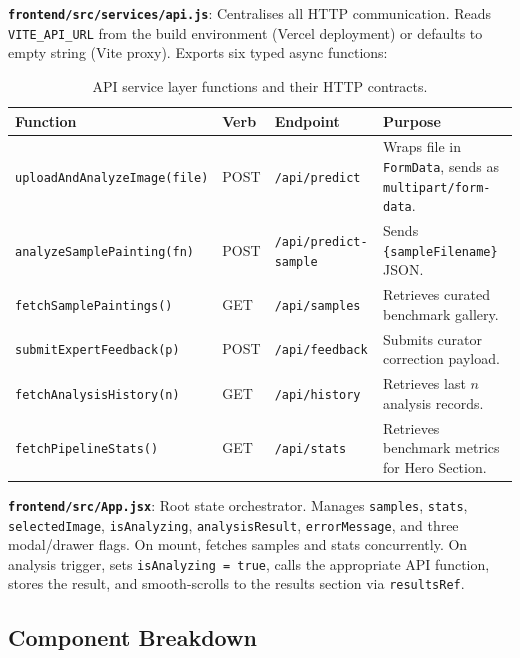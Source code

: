 \documentclass[12pt, a4paper, twoside]{article}
\begin{document}
\textbf{\texttt{frontend/src/services/api.js}}: Centralises all HTTP communication. Reads \texttt{VITE\_API\_URL} from the build environment (Vercel deployment) or defaults to empty string (Vite proxy). Exports six typed async functions:

\begin{table}[H]
  \centering
  \caption{API service layer functions and their HTTP contracts.}
  \label{tab:apiservice}
  \begin{tabularx}{\linewidth}{L{4.2cm} C{1.0cm} L{2.4cm} X}
    \toprule
    \textbf{Function} & \textbf{Verb} & \textbf{Endpoint} & \textbf{Purpose}\\
    \midrule
    \texttt{uploadAndAnalyzeImage(file)} & POST & \texttt{/api/predict} & Wraps file in \texttt{FormData}, sends as \texttt{multipart/form-data}.\\
    \texttt{analyzeSamplePainting(fn)}   & POST & \texttt{/api/predict-sample} & Sends \texttt{\{sampleFilename\}} JSON.\\
    \texttt{fetchSamplePaintings()}      & GET  & \texttt{/api/samples}        & Retrieves curated benchmark gallery.\\
    \texttt{submitExpertFeedback(p)}     & POST & \texttt{/api/feedback}       & Submits curator correction payload.\\
    \texttt{fetchAnalysisHistory(n)}     & GET  & \texttt{/api/history}        & Retrieves last $n$ analysis records.\\
    \texttt{fetchPipelineStats()}        & GET  & \texttt{/api/stats}          & Retrieves benchmark metrics for Hero Section.\\
    \bottomrule
  \end{tabularx}
\end{table}

\textbf{\texttt{frontend/src/App.jsx}}: Root state orchestrator. Manages \texttt{samples}, \texttt{stats}, \texttt{selectedImage}, \texttt{isAnalyzing}, \texttt{analysisResult}, \texttt{errorMessage}, and three modal/drawer flags. On mount, fetches samples and stats concurrently. On analysis trigger, sets \texttt{isAnalyzing = true}, calls the appropriate API function, stores the result, and smooth-scrolls to the results section via \texttt{resultsRef}.

\subsection{Component Breakdown}
\end{document}
